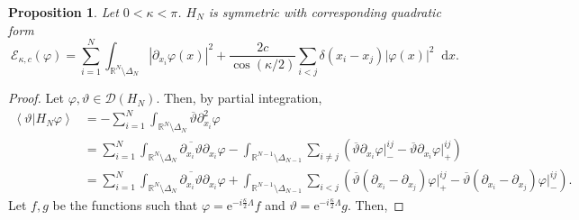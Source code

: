 \documentclass[a4paper,11pt]{article}
\newcommand{\euler}[1]{\text{e}^{#1}}
\newcommand{\abs}[1]{\left\lvert #1 \right\rvert}
\renewcommand{\braket}[1]{\left\langle#1\right\rangle}
\newcommand*\diff{\mathop{}\!\mathrm{d}}
\newcommand{\R}{\mathbb{R}}
\newtheorem{proposition}[theorem]{Proposition}
\numberwithin{equation}{section}
\begin{document}
	\begin{proposition}\label{PropositionAnyonQuadraticForm}
		Let $0<\kappa<\pi$. $ H_N $ is symmetric with corresponding quadratic form \begin{equation}
			\mathcal{E}_{\kappa,c}(\varphi)=\sum_{i=1}^{N}\int_{{\R^N\setminus\Delta_N}} \abs{\partial_{x_i}\varphi(x)}^2+\frac{2c}{\cos(\kappa/2)}\sum_{i<j} \delta(x_i-x_j)\abs{\varphi(x)}^2\diff x.
		\end{equation}
	\end{proposition}
	\begin{proof}
		Let $ \varphi,\vartheta\in \mathcal{D}(H_N) $. Then, by partial integration, \begin{equation}
			\begin{aligned}
				\braket{\vartheta\vert H_N \varphi}&=-\sum_{i=1}^{N}\int_{\R^N\setminus\Delta_N}\overline{\vartheta} \partial_{x_i}^2\varphi\\&=\sum_{i=1}^{N}\int_{\R^N\setminus\Delta_N}\overline{\partial_{x_i}\vartheta}\partial_{x_i}\varphi-\int_{\R^{N-1}\setminus\Delta_{N-1}}\sum_{i\neq j}\left(\overline{\vartheta}\partial_{x_i}\varphi\vert^{ij}_--\overline{\vartheta}\partial_{x_i}\varphi\vert^{ij}_+\right)\\
				&=\sum_{i=1}^{N}\int_{\R^N\setminus\Delta_N}\overline{\partial_{x_i}\vartheta}\partial_{x_i}\varphi+\int_{\R^{N-1}\setminus\Delta_{N-1}}\sum_{i< j}\left(\overline{\vartheta}(\partial_{x_i}-\partial_{x_j})\varphi\vert^{ij}_+-\overline{\vartheta}(\partial_{x_i}-\partial_{x_j})\varphi\vert^{ij}_-\right).
			\end{aligned}
		\end{equation}
		Let $ f,g$ be the functions such that $ \varphi=\euler{-i\frac{\kappa}{2}\Lambda}f $ and $ \vartheta=\euler{-i\frac{\kappa}{2}\Lambda}g $. Then,
		

\end{proof}
\end{document}

